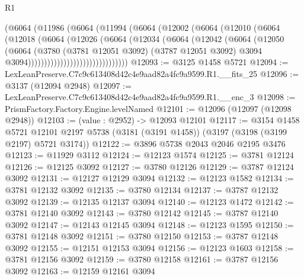 \begin{lexlean}{R1}
\begin{coremodule}
                          (@6064
                            (@11986
                              (@6064
                                (@11994
                                  (@6064
                                    (@12002
                                      (@6064
                                        (@12010
                                          (@6064
                                            (@12018
                                              (@6064
                                                (@12026
                                                  (@6064
                                                    (@12034
                                                      (@6064
                                                        (@12042
                                                          (@6064
                                                            (@12050
                                                              (@6064
                                                                (@3780
                                                                  (@3781 @12051 @3092)
                                                                  (@3787 @12051 @3092)
                                                                  @3094
                                                                  @3094)))))))))))))))))))))))))))))))
@12093 := @3125 @1458 @5721
@12094 := LexLeanPreserve.C7c9c613408d42c4e9aad82a4fc9a9599.R1.__fits_25
@12096 := @3137 (@12094 @2948)
@12097 := LexLeanPreserve.C7c9c613408d42c4e9aad82a4fc9a9599.R1.__enc_3
@12098 := PrismFactory.Factory.Engine.levelNamed
@12101 := @12096 (@12097 (@12098 @2948))
@12103 := (value : @2952) -> @12093 @12101
@12117 := @3154
    @1458
    @5721
    @12101
    @2197
    @5738
    (@3181 (@3191 @1458))
    (@3197 (@3198 (@3199 @2197) @5721 @3174))
@12122 := @3896 @5738 @2043 @2046 @2195 @3476
@12123 := @11929 @3112
@12124 := @12123 @1574
@12125 := @3781 @12124
@12126 := @12125 @3092
@12127 := @3780 @12126
@12129 := @3787 @12124 @3092
@12131 := @12127 @12129 @3094
@12132 := @12123 @1582
@12134 := @3781 @12132 @3092
@12135 := @3780 @12134
@12137 := @3787 @12132 @3092
@12139 := @12135 @12137 @3094
@12140 := @12123 @1472
@12142 := @3781 @12140 @3092
@12143 := @3780 @12142
@12145 := @3787 @12140 @3092
@12147 := @12143 @12145 @3094
@12148 := @12123 @1595
@12150 := @3781 @12148 @3092
@12151 := @3780 @12150
@12153 := @3787 @12148 @3092
@12155 := @12151 @12153 @3094
@12156 := @12123 @1603
@12158 := @3781 @12156 @3092
@12159 := @3780 @12158
@12161 := @3787 @12156 @3092
@12163 := @12159 @12161 @3094

\end{coremodule}
\end{lexlean}

